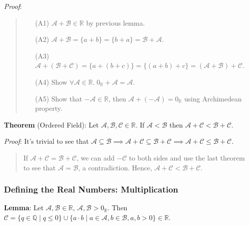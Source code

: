 \documentclass[11pt]{article}
\begin{document}
\emph{Proof}:
\begin{quote}\vspace{-0.3cm}
	\begin{enumerate}
	\item[(A1)] $\mathcal{A} + \mathcal{B} \in \mathbb{R}$ by previous lemma.
	\item[(A2)] $\mathcal{A} + \mathcal{B} = \{a + b\} = \{b + a\} = \mathcal{B} + \mathcal{A}$.
	\item[(A3)] $\mathcal{A} + (\mathcal{B} + \mathcal{C}) = \{a + (b+c)\} = \{(a+b) + c\} = (\mathcal{A} + \mathcal{B}) + \mathcal{C}$.
	\item[(A4)] Show $\forall \mathcal{A} \in \mathbb{R}.\; 0_\mathbb{R} + \mathcal{A} = \mathcal{A}$.
	\item[(A5)] Show that $-\mathcal{A} \in \mathbb{R}$, then $\mathcal{A} + (-\mathcal{A}) = 0_\mathbb{R}$ using Archimedean property.
	\end{enumerate}
\end{quote}
\textbf{Theorem} (Ordered Field): Let $\mathcal{A}, \mathcal{B}, \mathcal{C} \in \mathbb{R}$. If $\mathcal{A} < \mathcal{B}$ then $\mathcal{A} + \mathcal{C} < \mathcal{B} + \mathcal{C}$.

\emph{Proof}: It's trivial to see that $\mathcal{A} \subseteq \mathcal{B} \implies \mathcal{A} + \mathcal{C} \subseteq \mathcal{B} + \mathcal{C} \implies \mathcal{A} + \mathcal{C} \leq \mathcal{B} + \mathcal{C}$.
\begin{quote}\vspace{-0.3cm}
If $\mathcal{A} + \mathcal{C} = \mathcal{B} + \mathcal{C}$, we can add $- \mathcal{C}$ to both sides and use the last theorem to see that $\mathcal{A} = \mathcal{B}$, a contradiction. Hence, $\mathcal{A} + \mathcal{C} < \mathcal{B} + \mathcal{C}$.
\end{quote}

\subsubsection{Defining the Real Numbers: Multiplication}

\textbf{Lemma}: Let $\mathcal{A}, \mathcal{B} \in \mathbb{R}$, $\mathcal{A}, \mathcal{B} > 0_\mathbb{R}$. Then $\mathcal{C} = \{q \in \mathbb{Q} \mid q \leq 0\} \cup \{a \cdot b \mid a \in \mathcal{A}, b \in \mathcal{B}, a, b > 0\} \in \mathbb{R}$.
\end{document}
